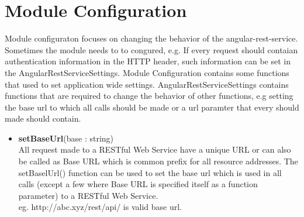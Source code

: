 \section{Module Configuration}


	Module configuraton focuses on changing the behavior of the angular-rest-service. Sometimes the module needs to to congured, e.g. If every request should contaian authentication information in the HTTP header, such information can be set in the AngularRestServiceSettings. Module Configuration contains some functions that used to set application wide settings. AngularRestServiceSettings contains functions that are required to change the behavior of other functions, e.g setting the base url to which all calls should be made or a url paramter that every should made should contain. 
	
\begin{itemize}

\item{ \textbf{setBaseUrl}(base : string) \\
	All request made to a RESTful Web Service have a unique URL or can also be called as Base URL which is common prefix for all resource addresses. The setBaselUrl() function can be used to set the base url which is used in all calls (except a few where Base URL is specified itself as a function parameter) to a RESTful Web Service. \\
	eg. http://abc.xyz/rest/api/ is valid base url.

}
\end{itemize}
